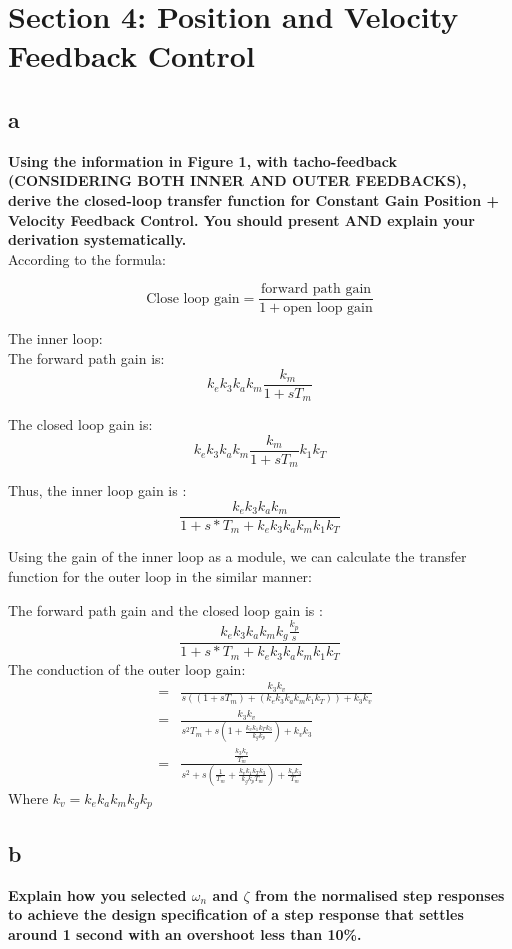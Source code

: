 \documentclass[11pt]{scrartcl}
\begin{document}
\section*{Section 4: Position and Velocity Feedback Control }

\subsection*{a}
\textbf{Using the information in Figure 1, with tacho-feedback (CONSIDERING BOTH INNER AND OUTER FEEDBACKS), derive the closed-loop transfer function for Constant Gain Position + Velocity Feedback Control. You should present AND explain your derivation systematically.}\\

According to the formula:
\begin{center}
$$ \text{Close loop gain} = \frac{\text{forward path gain}}{1+\text{open loop gain}} $$
\end{center}

The inner loop:\\

The forward path gain is:
$$k_ek_3k_ak_m\frac{k_m}{1+sT_m}$$

The closed loop gain is:
$$k_ek_3k_ak_m\frac{k_m}{1+sT_m}k_1k_T$$

Thus, the inner loop gain is :
$$\frac{k_ek_3k_ak_m}{1+s*T_m+k_ek_3k_ak_mk_1k_T}$$

Using the gain of the inner loop as a module, we can calculate the transfer function for the outer loop in the similar manner:

The forward path gain and the closed loop gain is :
$$\frac{k_ek_3k_ak_mk_g\frac{k_p}{s}}{1+s*T_m+k_ek_3k_ak_mk_1k_T}$$
The conduction of the outer loop gain:
\begin{eqnarray*}
&=&\frac{k_3k_v}{s((1+sT_m)+(k_ek_3k_ak_mk_1k_T))+k_3k_v}\\
&=&\frac{k_3k_v}{s^2T_m+s(1+\frac{k_vk_1k_Tk_3}{k_gk_p})+k_vk_3}\\
&=&\frac{\frac{k_3k_v}{T_m}}{s^2+s(\frac{1}{T_m}+\frac{k_vk_1k_Tk_3}{k_gk_pT_m})+\frac{k_vk_3}{T_m}}
\end{eqnarray*}
Where $k_v = k_ek_ak_mk_gk_p $

\subsection*{b}
\textbf{Explain how you selected $\omega_n$ and $\zeta$ from the normalised step responses to achieve the design specification of a step response that settles around 1 second with an overshoot less than 10\%.}\\
\end{document}

